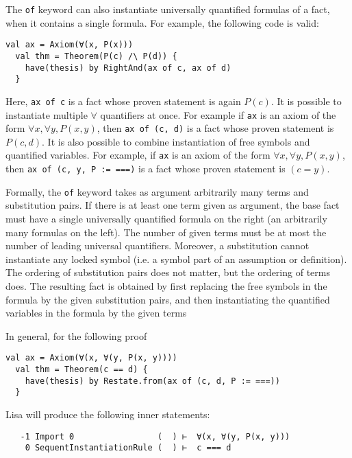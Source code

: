 The \lstinline|of| keyword can also instantiate universally quantified formulas of a fact, when it contains a single formula. For example, the following code is valid:
\begin{lstlisting}[language=lisa, frame=single]
  val ax = Axiom(∀(x, P(x)))
  val thm = Theorem(P(c) /\ P(d)) {
    have(thesis) by RightAnd(ax of c, ax of d)
  }
\end{lstlisting}
Here, \lstinline|ax of c| is a fact whose proven statement is again $P(c)$. It is possible to instantiate multiple $\forall$ quantifiers at once. For example if \lstinline|ax| is an axiom of the form $\forall x, \forall y, P(x, y)$, then \lstinline|ax of (c, d)| is a fact whose proven statement is $P(c, d)$. It is also possible to combine instantiation of free symbols and quantified variables. For example, if \lstinline|ax| is an axiom of the form $\forall x, \forall y, P(x, y)$, then \lstinline|ax of (c, y, P := ===)| is a fact whose proven statement is $(c = y)$.

Formally, the \lstinline|of| keyword takes as argument arbitrarily many terms and substitution pairs. If there is at least one term given as argument, the base fact must have a single universally quantified formula on the right (an arbitrarily many formulas on the left). The number of given terms must be at most the number of leading universal quantifiers. Moreover, a substitution cannot instantiate any locked symbol (i.e. a symbol part of an assumption or definition). The ordering of substitution pairs does not matter, but the ordering of terms does. The resulting fact is obtained by first replacing the free symbols in the formula by the given substitution pairs, and then instantiating the quantified variables in the formula by the given terms

In general, for the following proof
\begin{lstlisting}[language=lisa, frame=single]
  val ax = Axiom(∀(x, ∀(y, P(x, y))))
  val thm = Theorem(c == d) {
    have(thesis) by Restate.from(ax of (c, d, P := ===))
  }
\end{lstlisting}
Lisa will produce the following inner statements:
\begin{lstlisting}
   -1 Import 0                 (  ) ⊢  ∀(x, ∀(y, P(x, y)))
    0 SequentInstantiationRule (  ) ⊢  c === d
\end{lstlisting}

